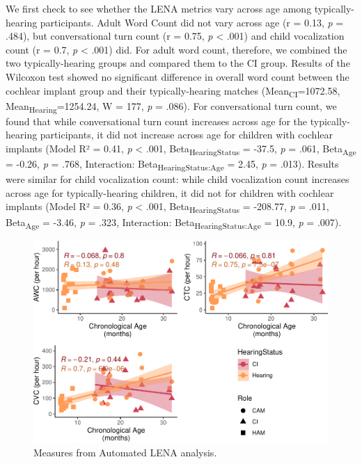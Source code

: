 \documentclass[
  man,floatsintext]{apa6}
\begin{document}
We first check to see whether the LENA metrics vary across age among typically-hearing participants. Adult Word Count did not vary across age (r = 0.13, \emph{p} = .484), but conversational turn count (r = 0.75, \emph{p} \textless{} .001) and child vocalization count (r = 0.7, \emph{p} \textless{} .001) did. For adult word count, therefore, we combined the two typically-hearing groups and compared them to the CI group. Results of the Wilcoxon test showed no significant difference in overall word count between the cochlear implant group and their typically-hearing matches (Mean\textsubscript{CI}=1072.58, Mean\textsubscript{Hearing}=1254.24, W = 177, \emph{p} = .086). For conversational turn count, we found that while conversational turn count increases across age for the typically-hearing participants, it did not increase across age for children with cochlear implants (Model R² = 0.41, \emph{p} \textless{} .001, Beta\textsubscript{HearingStatus} = -37.5, \emph{p} = .061, Beta\textsubscript{Age} = -0.26, \emph{p} = .768, Interaction: Beta\textsubscript{HearingStatus:Age} = 2.45, \emph{p} = .013). Results were similar for child vocalization count: while child vocalization count increases across age for typically-hearing children, it did not for children with cochlear implants (Model R² = 0.36, \emph{p} \textless{} .001, Beta\textsubscript{HearingStatus} = -208.77, \emph{p} = .011, Beta\textsubscript{Age} = -3.46, \emph{p} = .323, Interaction: Beta\textsubscript{HearingStatus:Age} = 10.9, \emph{p} = .007).

\begin{figure}
\centering
\includegraphics{DHH_Input_files/figure-latex/automated-plots-1.pdf}
\caption{\label{fig:automated-plots}Measures from Automated LENA analysis.}
\end{figure}
\end{document}
